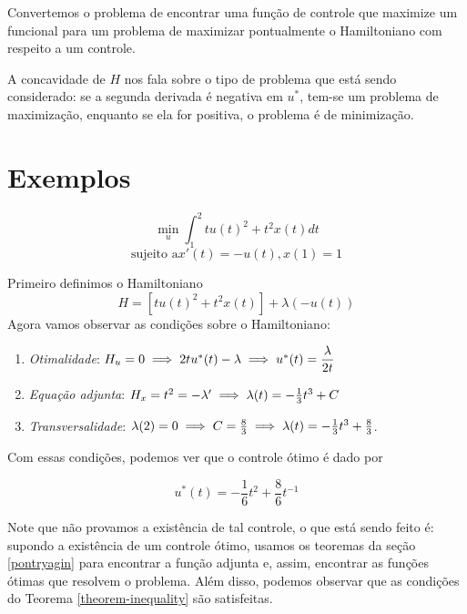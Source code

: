 \begin{remark}
    Convertemos o problema de encontrar uma função de controle que maximize um
    funcional para um problema de maximizar pontualmente o Hamiltoniano com
    respeito a um controle. 
\end{remark}

\begin{remark}
    A concavidade de $H$ nos fala sobre o tipo de problema que está sendo
    considerado: se a segunda derivada é negativa em $u^*$, tem-se um problema de
    maximização, enquanto se ela for positiva, o problema é de minimização. 
\end{remark}

\section{Exemplos}

\begin{example}
    \begin{equation*}
        \min_u \int_1^2 tu(t)^2 + t^2x(t) dt
    \end{equation*}
    \begin{equation*}
        \text{sujeito a} x'(t) = -u(t), x(1) = 1
    \end{equation*}
\end{example}

Primeiro definimos o Hamiltoniano 
$$
H = [tu(t)^2 + t^2 x(t)] + \lambda(- u(t))
$$
Agora vamos observar as condições sobre o Hamiltoniano:

\begin{enumerate}
    \item \textit{Otimalidade}: $H_u = 0 \implies 2tu^*(t) - \lambda \implies
    u^*(t) = \dfrac{\lambda}{2t}$
    \item \textit{Equação adjunta}: $H_x = t^2 = - \lambda ' \implies \lambda(t) = -
    \frac{1}{3}t^3 + C$
    \item \textit{Transversalidade}: $\lambda(2) = 0 \implies C = \frac{8}{3}
    \implies \lambda(t) = - \frac{1}{3}t^3 + \frac{8}{3}$.
\end{enumerate}

Com essas condições, podemos ver que o controle ótimo é dado por 

$$
u^*(t) = -\frac{1}{6}t^2 + \frac{8}{6}t^{-1}
$$

Note que não provamos a existência de tal controle, o que está sendo feito é:
supondo a existência de um controle ótimo, usamos os teoremas da seção
\ref{pontryagin} para encontrar a função adjunta e, assim, encontrar as
funções ótimas que resolvem o problema. Além disso, podemos observar que as
condições do Teorema \ref{theorem-inequality} são satisfeitas. 


